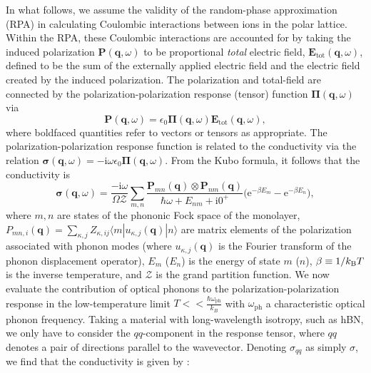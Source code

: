 \documentclass[aps,prb,twocolumn,
	           groupedaddress,superscriptaddress,
               amsfonts,amssymb,amsmath,floatfix,
	           citeautoscript]{revtex4-1}
\newcommand{\iu}{\mathrm{i}}
\newcommand{\e}{\mathrm{e}}
\begin{document}
In what follows, we assume the validity of the random-phase approximation (RPA) in calculating Coulombic interactions between ions in the polar lattice. Within the RPA, these Coulombic interactions are accounted for by taking the induced polarization $\mathbf{P}(\mathbf{q},\omega)$ to be proportional \emph{total} electric field, $\mathbf{E}_{\mathrm{tot}}(\mathbf{q},\omega)$, defined to be the sum of the externally applied electric field and the electric field created by the induced polarization. The polarization and total-field are connected by the polarization-polarization response (tensor) function  $\boldsymbol{\Pi}(\mathbf{q},\omega)$ via
\begin{equation}
\mathbf{P}(\mathbf{q},\omega)  = \epsilon_0\boldsymbol{\Pi}(\mathbf{q},\omega)\mathbf{E}_{\mathrm{tot}}(\mathbf{q},\omega),
\end{equation}
where boldfaced quantities refer to vectors or tensors as appropriate. The polarization-polarization response function is related to the conductivity via the relation $\boldsymbol{\sigma}(\mathbf{q},\omega) = -\iu\omega\epsilon_0\boldsymbol{\Pi}(\mathbf{q},\omega)$. From the Kubo formula, it follows that the conductivity is
\begin{equation}\label{eq:2dsusceptibility}
    \boldsymbol{\sigma}(\mathbf{q},\omega) =  \frac{-\iu \omega}{ \Omega\mathcal{Z}}\sum\limits_{m,n}\frac{\mathbf{P}_{mn}(\mathbf{q})\otimes\mathbf{P}_{nm}(\mathbf{q})}{\hbar\omega + E_{nm}+\iu 0^+}\Big(\e^{-\beta E_m}-\e^{-\beta E_n} \Big),
\end{equation}
where $m,n$ are states of the phononic Fock space of the monolayer, $P_{mn,i}(\mathbf{q}) = \sum_{\kappa,j}Z_{\kappa,ij}\langle m | u_{\kappa,j}(\mathbf{q}) | n \rangle$ are matrix elements of the polarization associated with phonon modes (where $u_{\kappa,j}(\mathbf{q})$ is the Fourier transform of the phonon displacement operator), $E_{m}$ ($E_n$) is the energy of state $m$ ($n$), $\beta \equiv 1/k_{\text{\textsc{B}}}T$ is the inverse temperature, and $\mathcal{Z}$ is the grand partition function. We now evaluate the contribution of optical phonons to the polarization-polarization response in the low-temperature limit $T << \frac{\hbar\omega_{\mathrm{ph}}}{k_B}$ with $\omega_{\mathrm{ph}}$ a characteristic optical phonon frequency.  Taking a material with long-wavelength isotropy, such as hBN, we only have to consider the $qq$-component in the response tensor, where $qq$ denotes a pair of directions parallel to the wavevector. Denoting $\sigma_{qq}$ as simply $\sigma$, we find that the conductivity is given by \cite{rivera2018ab}: 
\end{document}
